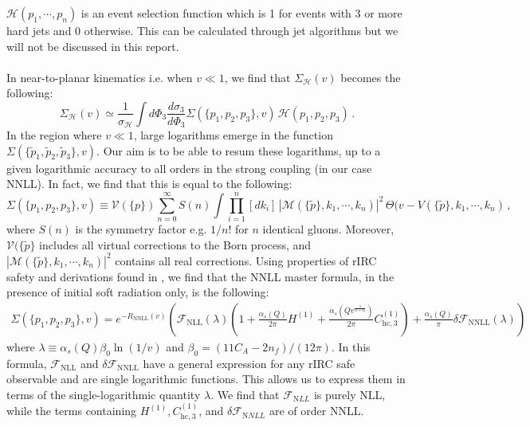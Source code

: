 $\mathcal{H}(p_1,\cdots ,p_n)$ is an event selection function which is 1 for events with 3 or more hard jets and 0 otherwise. This can be calculated through jet algorithms but we will not be discussed in this report. \\ \\
In near-to-planar kinematics i.e. when $v\ll1$, we find that $\Sigma_{\mathcal{H}}(v)$ becomes the following:
 \begin{equation}
	\Sigma_{\mathcal{H}}(v)\simeq\frac{1}{\sigma_{\mathcal{H}}}\int d\Phi_3\frac{d\sigma_3}{d\Phi_3}\Sigma(\{p_1,p_2,p_3\},v)\,\mathcal{H}(p_1,p_2,p_3)\,.
	\label{eq:hard-cumulant-approx}
\end{equation}
In the region where $v\ll1$, large logarithms emerge in the function $\Sigma(\{\tilde{p}_1,\tilde{p}_2,\tilde{p}_3\},v)$. Our aim is to be able to resum these logarithms, up to a given logarithmic accuracy to all orders in the strong coupling (in our case NNLL). In fact, we find that this is equal to the following:
\begin{equation}
	\Sigma(\{p_1,p_2,p_3\},v)\equiv\mathcal{V}(\{p\})\sum_{n=0}^\infty S(n)\int\prod_{i=1}^n[dk_i]\,|\mathcal{M}(\{\tilde{p}\},k_1,\cdots ,k_n)|^2\,\Theta(v-V(\{\tilde{p}\},k_1,\cdots ,k_n)\, ,
	\label{eq:born-cumulant}
\end{equation}
where $S(n)$ is the symmetry factor e.g. $1/n!$ for $n$ identical gluons. Moreover, $\mathcal{V}(\{\tilde{p}\}$ includes all virtual corrections to the Born process, and $|\mathcal{M}(\{\tilde{p}\},k_1,\cdots ,k_n)|^2$ contains all real corrections.
Using properties of rIRC safety and derivations found in \cite{Banfi:2018mcq}, we find that the NNLL master formula, in the presence of initial soft radiation only, is the following:
\begin{multline}
  \label{eq:Sigma-NNLL-fs}
  \Sigma(\{p_1,p_2,p_3\},v)= e^{-R_{\mathrm{NNLL}}(v)}\left(\mathcal{F}_{\mathrm{NLL}}(\lambda)(1+\frac{\alpha_s(Q)}{2\pi}H^{(1)}
      +\frac{\alpha_s(Qv^{\frac{1}{a+b_3}})}{2\pi}C_{\mathrm{hc},3}^{(1)}) +\frac{\alpha_s(Q)}{\pi} \delta\mathcal{F}_{\mathrm{NNLL}}(\lambda)\right)
\end{multline}
where $\lambda\equiv \alpha_s(Q)\beta_0\ln(1/v)$ and
$\beta_0=(11 C_A\!-2 n_f)/(12\pi)$. 
In this formula, \(\mathcal{F}_{\mathrm{NLL}}\) and \(\delta\mathcal{F}_{\mathrm{NNLL}}\) have a general expression for any rIRC safe observable and are single logarithmic functions. This allows us to express them in terms of the single-logarithmic quantity \(\lambda\). We find that \(\mathcal{F}_{\mathrm NLL}\) is purely NLL, while the terms containing \(H^{(1)}, C_{\mathrm{hc},3}^{(1)}\), and \(\delta\mathcal{F}_{\mathrm NNLL}\) are of order NNLL. \\ \\
